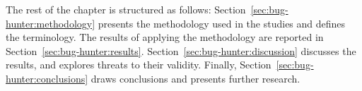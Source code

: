 
The rest of the chapter is structured as follows:
Section~\ref{sec:bug-hunter:methodology} presents the methodology used in the studies and defines the terminology. 
The results of applying the methodology are reported in Section~\ref{sec:bug-hunter:results}.
Section~\ref{sec:bug-hunter:discussion} discusses the results, and explores threats to their validity.
Finally, Section~\ref{sec:bug-hunter:conclusions} draws conclusions and presents further research.



